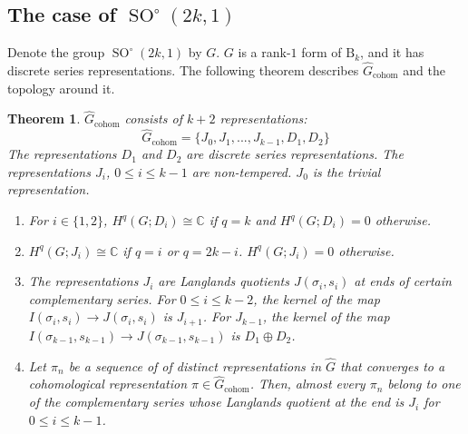 \documentclass[12pt,reqno]{amsart}
\newtheorem{theorem}{Theorem}[section]
\theoremstyle{definition}
\newcommand{\SO}{\operatorname{SO}}
\begin{document}
\subsection{The case of $\SO^\circ(2k,1)$}
Denote the group $\SO^\circ(2k,1)$ by $G$. $G$ is a rank-$1$ form of $\mathrm{B}_k$, and it has discrete series representations. The following theorem describes $\widehat{G}_\mathrm{cohom}$ and the topology around it. 
\begin{theorem}\label{thm:cohomological dual so(2k,1)}
    $\widehat{G}_\mathrm{cohom}$ consists of $k+2$ representations:
    \[
    \widehat{G}_\mathrm{cohom}=\{J_0, J_1, ..., J_{k-1},D_1,D_2\}
    \]
    The representations $D_1$ and $D_2$ are discrete series representations. The representations $J_i$, $0 \leq i \leq k-1$ are non-tempered. $J_0$ is the trivial representation.
    \begin{enumerate}
        \item  For $i \in \{1,2\}$, $H^q(G;D_i) \cong \mathbb{C}$ if $q=k$ and $H^q(G;D_i) = 0$ otherwise.
        \item $H^q(G;J_i) \cong \mathbb{C}$ if $q=i$ or $q=2k - i$. $H^q(G;J_i)=0$ otherwise.
        \item The representations $J_i$ are Langlands quotients $J(\sigma_i,s_i)$ at ends of certain complementary series. For $0 \leq i \leq k-2$, the kernel of the map $I(\sigma_i,s_i) \to J(\sigma_i,s_i)$ is $J_{i+1}$. For $J_{k-1}$, the kernel of the map $I(\sigma_{k-1},s_{k-1}) \to J(\sigma_{k-1},s_{k-1})$ is $D_1\oplus D_2$.
        \item Let $\pi_n$ be a sequence of of distinct representations in $\widehat{G}$ that converges to a cohomological representation $\pi \in \widehat{G}_{\mathrm{cohom}}$. Then, almost every $\pi_n$ belong to one of the complementary series whose Langlands quotient at the end is $J_i$ for $0 \leq i \leq k-1$.
    \end{enumerate}
\end{theorem}
\end{document}
